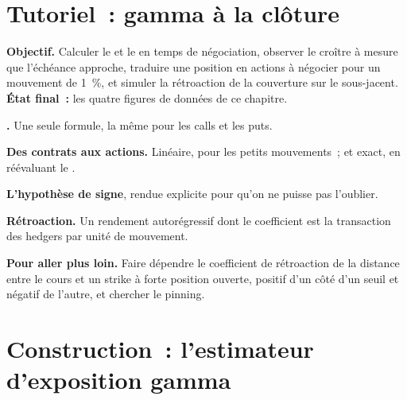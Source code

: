 \section{Tutoriel~: gamma à la clôture}\label{tut:m1:zero-day-options-and-retail-flow:gamma}

\begin{tutorial}
\textbf{Objectif.} Calculer le  et le  en temps de négociation, observer le  
croître à mesure que l'échéance approche, traduire une position en actions à négocier
pour un mouvement de 1~\%, et simuler la rétroaction de la couverture sur le sous-jacent.
\textbf{État final~:} les quatre figures de données de ce chapitre.
\begin{tutsteps}
\item \textbf{.} Une seule formule, la même pour les calls et les puts.
\label{lst:m1:zero-day-options-and-retail-flow:gamma}
\item \textbf{Des contrats aux actions.} Linéaire, pour les petits mouvements~; et exact,
en réévaluant le .
\label{lst:m1:zero-day-options-and-retail-flow:shares}
\item \textbf{L'hypothèse de signe}, rendue explicite pour qu'on ne puisse pas
l'oublier.
\label{lst:m1:zero-day-options-and-retail-flow:dealer}
\item \textbf{Rétroaction.} Un rendement autorégressif dont le coefficient est la
transaction des hedgers par unité de mouvement.
\end{tutsteps}
\textbf{Pour aller plus loin.} Faire dépendre le coefficient de rétroaction de la distance entre le cours
et un strike à forte position ouverte, positif d'un côté d'un seuil et négatif de l'autre, et chercher le
pinning.
\end{tutorial}

\section{Construction~: l'estimateur d'exposition gamma}\label{bld:m1:zero-day-options-and-retail-flow:gex}

